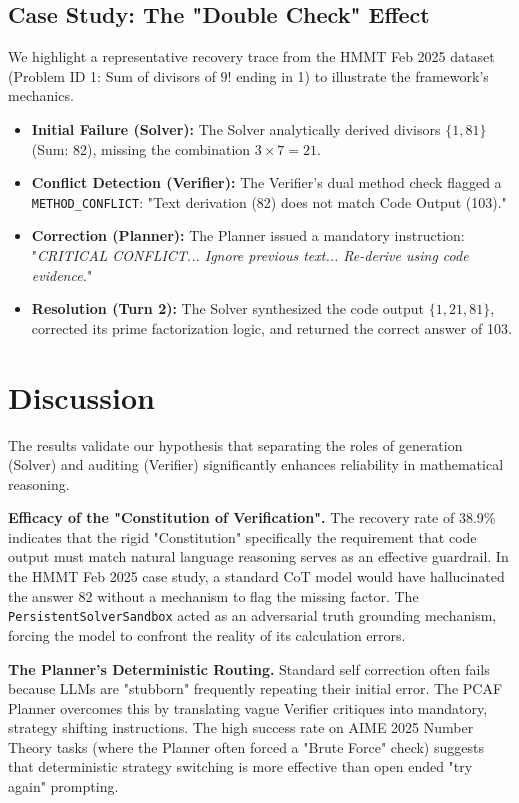 \documentclass{article}
\begin{document}
\subsection{Case Study: The "Double Check" Effect}
We highlight a representative recovery trace from the HMMT Feb 2025 dataset (Problem ID 1: Sum of divisors of $9!$ ending in 1) to illustrate the framework's mechanics.

\begin{itemize}
    \item \textbf{Initial Failure (Solver):} The Solver analytically derived divisors $\{1, 81\}$ (Sum: 82), missing the combination $3 \times 7 = 21$.
    \item \textbf{Conflict Detection (Verifier):} The Verifier's dual method check flagged a \texttt{METHOD\_CONFLICT}: "Text derivation (82) does not match Code Output (103)."
    \item \textbf{Correction (Planner):} The Planner issued a mandatory instruction: "\textit{CRITICAL CONFLICT... Ignore previous text... Re-derive using code evidence.}"
    \item \textbf{Resolution (Turn 2):} The Solver synthesized the code output $\{1, 21, 81\}$, corrected its prime factorization logic, and returned the correct answer of 103.
\end{itemize}

\section{Discussion}
\label{sec:discussion}

The results validate our hypothesis that separating the roles of generation (Solver) and auditing (Verifier) significantly enhances reliability in mathematical reasoning.

\textbf{Efficacy of the "Constitution of Verification".} 
The recovery rate of 38.9\% indicates that the rigid "Constitution" specifically the requirement that code output must match natural language reasoning serves as an effective guardrail. In the HMMT Feb 2025 case study, a standard CoT model would have hallucinated the answer 82 without a mechanism to flag the missing factor. The \texttt{PersistentSolverSandbox} acted as an adversarial truth grounding mechanism, forcing the model to confront the reality of its calculation errors.

\textbf{The Planner's Deterministic Routing.} 
Standard self correction often fails because LLMs are "stubborn" frequently repeating their initial error. The PCAF Planner overcomes this by translating vague Verifier critiques into mandatory, strategy shifting instructions. The high success rate on AIME 2025 Number Theory tasks (where the Planner often forced a "Brute Force" check) suggests that deterministic strategy switching is more effective than open ended "try again" prompting.
\end{document}
